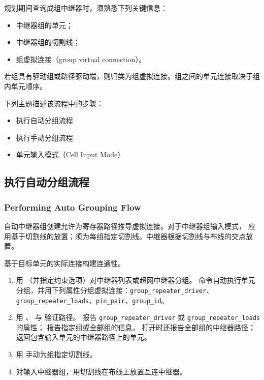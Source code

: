 规划期间查询成组中继器时，须熟悉下列关键信息：
\begin{itemize}
  \item 中继器组的单元；
  \item 中继器组的切割线；
  \item 组虚拟连接（group virtual connection）。
\end{itemize}

若组具有驱动组或路径驱动端，则归类为组虚拟连接。组之间的单元连接取决于组内单元顺序。

下列主题描述该流程中的步骤：
\begin{itemize}
  \item 执行自动分组流程
  \item 执行手动分组流程
  \item 单元输入模式（Cell Input Mode）
\end{itemize}

\subsection{执行自动分组流程}
\subsubsection*{Performing Auto Grouping Flow}

自动中继器组创建允许为寄存器路径推导虚拟连接。对于中继器组输入模式， 应用基于切割线的放置；须为每组指定切割线。中继器根据切割线与布线的交点放置。

基于目标单元的实际连接构建连通性。
\begin{enumerate}
  \item 用 （并指定约束选项）对中继器列表或超网中继器分组。
  命令自动执行单元分组，并用下列属性分组虚拟连接：\texttt{group\_repeater\_driver}、\texttt{group\_repeater\_loads}、\texttt{pin\_pair}、\texttt{group\_id}。
  \item 用 、 与  验证路径。
   报告 \texttt{group\_repeater\_driver} 或 \texttt{group\_repeater\_loads} 的属性；
   报告指定组或全部组的信息， 打开时还报告全部组的中继器路径；
   返回包含输入单元的中继器路径上的单元。
  \item 用    手动为组指定切割线。
  \item 对输入中继器组，用切割线在布线上放置互连中继器。
\end{enumerate}

